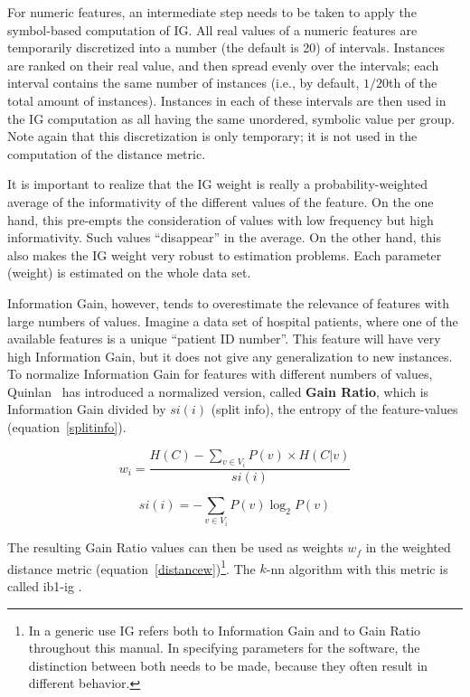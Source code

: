 \documentclass{report}
\begin{document}
For numeric features, an intermediate step needs to be taken to apply
the symbol-based computation of IG. All real values of a numeric
features are temporarily discretized into a number (the default is 20)
of intervals. Instances are ranked on their real value, and then
spread evenly over the intervals; each interval contains the same
number of instances (i.e., by default, $1/20$th of the total amount of
instances). Instances in each of these intervals are then used in the
IG computation as all having the same unordered, symbolic value per
group. Note again that this discretization is only temporary; it is
not used in the computation of the distance metric.

It is important to realize that the IG weight is really a
probability-weighted average of the informativity of the different
values of the feature. On the one hand, this pre-empts the
consideration of values with low frequency but high
informativity. Such values ``disappear'' in the average. On the other
hand, this also makes the IG weight very robust to estimation
problems. Each parameter (weight) is estimated on the whole data set.

Information Gain, however, tends to overestimate the relevance of
features with large numbers of values. Imagine a data set of hospital
patients, where one of the available features is a unique ``patient ID
number''. This feature will have very high Information Gain, but it
does not give any generalization to new instances. To normalize
Information Gain for features with different numbers of values,
Quinlan~\cite{Quinlan93} has introduced a normalized version, called
{\bf Gain Ratio}, which is Information Gain divided by $si(i)$ (split info),
the entropy of the feature-values (equation~\ref{splitinfo}).

\begin{equation}
w_{i} = \frac{H(C) -  \sum_{v \in V_{i}} P(v) \times H(C|v)}{si(i)}
\label{IGgainratio}
\end{equation}

\begin{equation}
si(i) = - \sum_{v \in V_{i}} P(v) \log_{2} P(v)
\label{splitinfo}
\end{equation}

The resulting Gain Ratio values can then be used as weights $w_{f}$ in
the weighted distance metric (equation~\ref{distancew})\footnote{In a
generic use IG refers both to Information Gain and to Gain Ratio
throughout this manual. In specifying parameters for the software, the
distinction between both needs to be made, because they often result
in different behavior.}. The $k$-{\sc nn} algorithm with this
metric is called {\sc ib1-ig} \cite{Daelemans+92b}.
\end{document}

